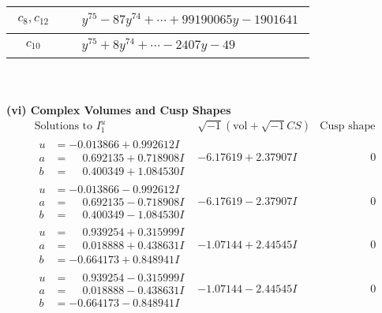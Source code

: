 \documentclass[1p]{elsarticle_modified}
\theoremstyle{definition}
\newcommand{\I}{\sqrt{-1}}
\begin{document}
\begin{tabular}{m{50pt}|m{274pt}}
\hline $$\begin{aligned}c_{8},c_{12}\end{aligned}$$&$\begin{aligned}
&y^{75}-87 y^{74}+\cdots+99190065 y-1901641
\end{aligned}$\\
\hline $$\begin{aligned}c_{10}\end{aligned}$$&$\begin{aligned}
&y^{75}+8 y^{74}+\cdots-2407 y-49
\end{aligned}$\\
\hline
\end{tabular}\\~\\
\newpage\flushleft \textbf{(vi) Complex Volumes and Cusp Shapes}
$$\begin{array}{c|c|c}  
\text{Solutions to }I^u_{1}& \I (\text{vol} + \sqrt{-1}CS) & \text{Cusp shape}\\
 \hline 
\begin{aligned}
u &= -0.013866 + 0.992612 I \\
a &= \phantom{-}0.692135 + 0.718908 I \\
b &= \phantom{-}0.400349 + 1.084530 I\end{aligned}
 & -6.17619 + 2.37907 I & \phantom{-0.000000 } 0 \\ \hline\begin{aligned}
u &= -0.013866 - 0.992612 I \\
a &= \phantom{-}0.692135 - 0.718908 I \\
b &= \phantom{-}0.400349 - 1.084530 I\end{aligned}
 & -6.17619 - 2.37907 I & \phantom{-0.000000 } 0 \\ \hline\begin{aligned}
u &= \phantom{-}0.939254 + 0.315999 I \\
a &= \phantom{-}0.018888 + 0.438631 I \\
b &= -0.664173 + 0.848941 I\end{aligned}
 & -1.07144 + 2.44545 I & \phantom{-0.000000 } 0 \\ \hline\begin{aligned}
u &= \phantom{-}0.939254 - 0.315999 I \\
a &= \phantom{-}0.018888 - 0.438631 I \\
b &= -0.664173 - 0.848941 I\end{aligned}
 & -1.07144 - 2.44545 I & \phantom{-0.000000 } 0 \\ \hline\begin{aligned}

\end{aligned}
\end{array}$$
\end{document}
